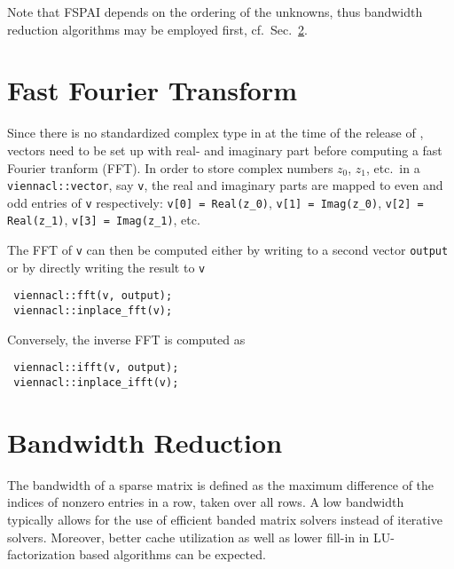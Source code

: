 Note that FSPAI depends on the ordering of the unknowns, thus bandwidth reduction algorithms may be employed first, cf.~Sec.~\ref{sec:bandwidth-reduction}.


\section{Fast Fourier Transform}

Since there is no standardized complex type in {\OpenCL} at the time of the release of {\ViennaCLversion}, vectors need to be set up with real- and imaginary
part before computing a fast Fourier tranform (FFT). In order to store complex numbers $z_0$, $z_1$, etc.~in a \lstinline|viennacl::vector|, say \lstinline|v|,
the real and imaginary parts are mapped to even and odd entries of \lstinline|v| respectively: \lstinline|v[0] = Real(z_0)|, \lstinline|v[1] = Imag(z_0)|,
\lstinline|v[2] = Real(z_1)|, \lstinline|v[3] = Imag(z_1)|, etc.

The FFT of \lstinline|v| can then be computed either by writing to a second vector \lstinline|output| or by directly writing the result to \lstinline|v|
\begin{lstlisting}
 viennacl::fft(v, output);
 viennacl::inplace_fft(v);
\end{lstlisting}
Conversely, the inverse FFT is computed as
\begin{lstlisting}
 viennacl::ifft(v, output);
 viennacl::inplace_ifft(v);
\end{lstlisting}


\section{Bandwidth Reduction} \label{sec:bandwidth-reduction}

The bandwidth of a sparse matrix is defined as the maximum difference of the indices of nonzero entries in a row, taken over all rows. A low bandwidth
typically allows for the use of efficient banded matrix solvers instead of iterative solvers. Moreover, better cache utilization as well as lower fill-in in
LU-factorization based algorithms can be expected.

